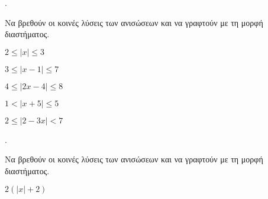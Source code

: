 \documentclass[11pt,a4paper,twocolumn]{article}
\newcounter{askhsh}
\newcommand{\askhsh}{\large\theaskhsh.\ \addtocounter{askhsh}{1}}
\begin{document}
\askhsh Να βρεθούν οι κοινές λύσεις των ανισώσεων και να γραφτούν με τη μορφή διαστήματος.
\begin{multicols}{2}
\begin{alist}
\item $ 2\leq\left|x\right|\leq3 $
\item $ 3\leq\left|x-1\right|\leq7 $
\item $4\leq\left|2x-4\right|\leq8 $
\item $1<\left|x+5\right|\leq5 $
\item $2\leq\left|2-3x\right|<7 $
\end{alist}
\end{multicols}
\askhsh Να βρεθούν οι κοινές λύσεις των ανισώσεων και να γραφτούν με τη μορφή διαστήματος.
\begin{multicols}{2}
\begin{alist}
\item $ 2\left( \left|x\right|+2\right) $
\end{alist}
\end{multicols}
\end{document}
